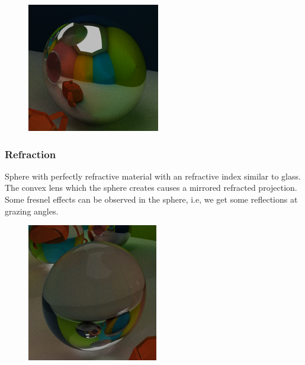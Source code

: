 \documentclass[a4paper, twocolumn]{article}
\begin{document}
            \begin{figure}[H]
                \centering
                \includegraphics[width=0.8\linewidth]{share/new_render_reflection.png}
                \label{fig:render_reflection}
            \end{figure}

            \subsubsection*{Refraction}

            Sphere with perfectly refractive material with an refractive index similar to glass. The convex lens which the sphere creates causes a mirrored refracted projection. Some fresnel effects can be observed in the sphere, i.e, we get some reflections at grazing angles.
            \begin{figure}[H]
                \centering
                \includegraphics[width=0.8\linewidth]{share/new_render_refraction.png}
                \label{fig:render_refraction}
            \end{figure}
\end{document}
